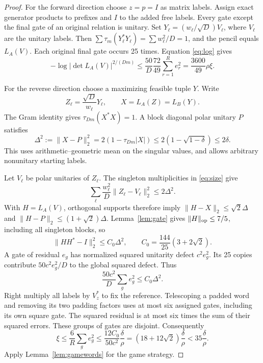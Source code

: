 \documentclass[11pt,a4paper]{article}
\newcommand{\norm}[1]{\lVert#1\rVert}
\begin{document}
\begin{proof}
For the forward direction choose $z=p=I$ as matrix labels. Assign exact generator products to prefixes and $I$ to the added free labels. Every gate except the final gate of an original relation is unitary. Set $Y_\ell=(w_\ell/\sqrt D)V_\ell$, where $V_\ell$ are the unitary labels. Then $\sum\tau_m(Y_\ell^*Y_\ell)=\sum w_\ell^2/D=1$, and the pencil equals $L_A(V)$. Each original final gate occurs 25 times. Equation \eqref{eq:log} gives
\[
 -\log\left|\det L_A(V)\right|^{2/(Dm)}
 \le\frac{50}{D}\frac{72}{49}
       \sum_{r=1}^R e_r^2
 =\frac{3600}{49}\rho\xi .
\]

For the reverse direction choose a maximizing feasible tuple $Y$. Write
\[
 Z_\ell=\frac{\sqrt D}{w_\ell}Y_\ell,\qquad
 X=L_A(Z)=L_B(Y).
\]
The Gram identity gives $\tau_{Dm}(X^*X)=1$. A block diagonal polar unitary $P$ satisfies
\begin{equation}
 \Delta^2:=\norm{X-P}_2^2
 =2(1-\tau_{Dm}|X|)
 \le2(1-\sqrt{1-\delta})\le2\delta.                    \label{eq:polar}
\end{equation}
This uses arithmetic--geometric mean on the singular values, and allows arbitrary nonunitary starting labels.

Let $V_\ell$ be polar unitaries of $Z_\ell$. The singleton multiplicities in \eqref{eq:size} give
\[
 \sum_\ell\frac{w_\ell^2}{D}\norm{Z_\ell-V_\ell}_2^2
 \le2\Delta^2.
\]
With $H=L_A(V)$, orthogonal supports therefore imply
$\norm{H-X}_2\le\sqrt2\Delta$ and
$\norm{H-P}_2\le(1+\sqrt2)\Delta$. Lemma~\ref{lem:gate} gives $\norm H_{\rm op}\le7/5$, including all singleton blocks, so
\[
 \norm{HH^*-I}_2^2\le C_0\Delta^2,
 \qquad C_0=\frac{144}{25}(3+2\sqrt2).
\]
A gate of residual $e_g$ has normalized squared unitarity defect $c^2e_g^2$. Its 25 copies contribute $50c^2 e_g^2/D$ to the global squared defect. Thus
\[
 \frac{50c^2}{D}\sum_g e_g^2\le C_0\Delta^2.
\]
Right multiply all labels by $V_z^*$ to fix the reference. Telescoping a padded word and removing its two padding factors uses at most six assigned gates, including its own square gate. The squared residual is at most six times the sum of their squared errors. These groups of gates are disjoint. Consequently
\[
 \xi\le\frac6R\sum_g e_g^2
 \le\frac{12C_0}{50c^2}\frac{\delta}{\rho}
 =(18+12\sqrt2)\frac{\delta}{\rho}
 <35\frac{\delta}{\rho}.
\]
Apply Lemma~\ref{lem:gamewords} for the game strategy.
\end{proof}
\end{document}
